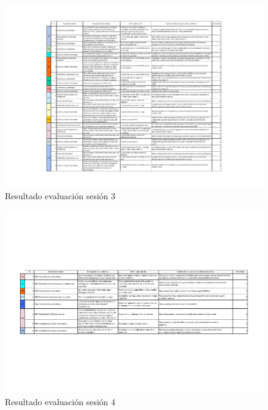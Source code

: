 \begin{figure}[H]
    \centering
    \includegraphics[angle=270,width=1.\textwidth]{Imagenes/Hito6/Evaluación Sesión 3.pdf}
    \caption{Resultado evaluación sesión 3}
    \label{fig:eva-s3}
\end{figure}

\begin{figure}[H]
    \centering
    \includegraphics[angle=270,width=1.\textwidth]{Imagenes/Hito6/Evaluación Sesión 4.pdf}
    \caption{Resultado evaluación sesión 4}
    \label{fig:eva-s4}
\end{figure}

